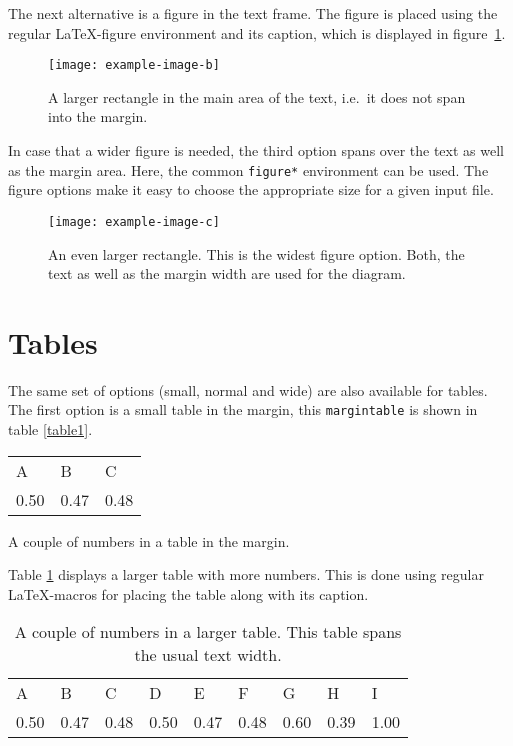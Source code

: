 \documentclass{shindig_book}
\begin{document}
The next alternative is a figure in the text frame. The figure is placed using the regular \LaTeX-figure environment and its  caption, which is displayed in figure~\ref{rectangle2}. 
%
\begin{figure}[htbp]%
	\texttt{[image: example-image-b]}%
	\caption{A larger rectangle in the main area of the text, i.e.\ it does not span into the margin.}%
	\label{rectangle2}%
\end{figure}%
%

In case that a wider figure is needed, the third option spans over the text as well as the margin area. Here, the common \texttt{figure*} environment can be used. The figure options make it easy to choose the appropriate size for a given input file. 
%
\begin{figure*}[htbp]
    \texttt{[image: example-image-c]}%
    \caption{An even larger rectangle. This is the widest figure option. Both, the text as well as the margin width are used for the diagram.}
    \label{rectangle3}
\end{figure*}
%

\section{Tables}
The same set of options (small, normal and wide) are also available for tables. The first option is a small table in the margin, this \texttt{margintable} is shown in table \ref{table1}.
%
\begin{margintable}%
	\begin{tabular}{lll}%
     A&B&C\\%
     0.50&0.47&0.48\\%
    \end{tabular}%
	\vspace{2pt}
	\caption{A couple of numbers in a table in the margin.\label{table1}}%
\end{margintable}%

Table \ref{table2} displays a larger table with more numbers. This is done using regular \LaTeX-macros for placing the table along with its caption. 
%
\begin{table}[htbp]%
	 \begin{tabular}{lllllllll}%
     A&B&C&D&E&F&G&H&I\\%
    0.50&0.47&0.48&0.50&0.47&0.48&0.60&0.39&1.00\\%
    \end{tabular}%
	\vspace{2pt}%
	\captionsetup{width=\textwidth, justification=justified}%
	\caption{A couple of numbers in a larger table. This table spans the usual text width.\label{table2}}%
\end{table}%
\end{document}

